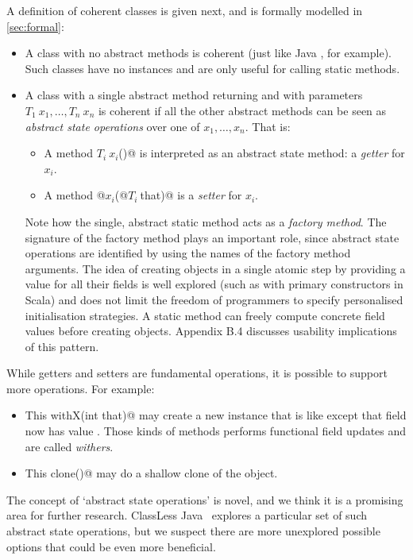 \noindent A definition of coherent
classes is given next, and is formally modelled in \autoref{sec:formal}:
\begin{itemize}
\item A class with no abstract methods is coherent (just like Java
  \Q@Math@, for example). Such classes have no instances and are only useful for calling static methods.
\item A class with a single abstract \Q@static@ method 
returning \Q@This@ and with parameters $T_1\ x_1, \ldots, T_n\ x_n$
is coherent if all the other abstract methods can be seen as \emph{abstract state
operations} over one of $x_1, \ldots, x_n$.
That is:
\begin{itemize}
\item A method $T_i\ x_i$\Q@()@ is interpreted as an abstract state method: a \emph{getter} for $x_i$.
\item A method \Q@void @$x_i$\Q@(@$T_i\ $\Q@ that)@ is a \emph{setter} for $x_i$.
\end{itemize}

Note how the single, abstract static
method acts as a \emph{factory method}.
The signature of the factory method plays an important role, since
abstract state operations are identified by using the names of the
factory method arguments.
The idea of creating objects in a single atomic step by providing a value for all their fields is well explored (such as with primary constructors in Scala) and does not limit the freedom of programmers to specify personalised initialisation strategies.
A static method can freely compute concrete field values before creating objects. Appendix B.4 discusses usability implications of this pattern.
\end{itemize}
\noindent
While getters and setters are fundamental operations, it is possible to
support more operations. For example:
\begin{itemize}
\item \Q@method This withX(int that)@
may create a new instance that is like \Q@this@ except that field \Q@x@ now has value \Q@that@.
Those kinds of methods 
performs functional field updates
and are called \emph{withers}.
\item\Q@method This clone()@ may do a shallow clone of the object.
\end{itemize}

The concept of `abstract state operations'
is novel, and we think it
is a promising area for further research.
ClassLess Java~\cite{wang2016classless} explores a particular
set of such abstract state operations,
but we suspect there are more unexplored possible options that could be even more beneficial.


